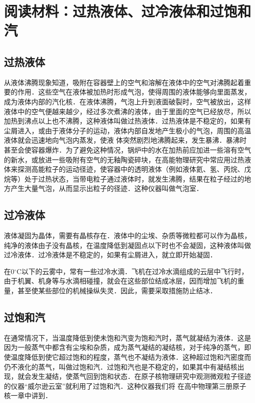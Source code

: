 \section*{阅读材料：过热液体、过冷液体和过饱和汽}
\subsection*{过热液体} 

从液体沸腾现象知道，吸附在容器壁上的空气和溶解在液体中的空气对沸腾起着重要的作用．这些空气在液体被加热时形成气泡，使得周围的液体能够向里面蒸发，成为液体内部的汽化核．在液体沸腾，气泡上升到液面破裂时，空气被放出，这样液体中的空气便越来越少，经过多次煮沸的液体，由于里面的空气已经放尽，所以加热到沸点以上也不沸腾，这种液体叫做过热液体．过热液体是不稳定的，如果有尘屑进入，或由于液体分子的运动，液体内部自发地产生极小的气泡，周围的高温液体就会迅速地向气泡内蒸发，使液
体突然剧烈地沸腾起来，发生暴沸．暴沸时甚至会使容器爆炸．为了避免这种情况，锅炉中的水在加热前应加进一些溶有空气的新水，或放进一些吸附有空气的无釉陶瓷碎块，在高能物理研究中常应用过热液体来探测高能粒子的运动径迹，使容器中的透明液体（例如液体氦、氢、丙烷、戊烷等）处于过热状态，当带电粒子通过液体时，就发生沸腾，结果在粒子经过的地方产生大量气泡，从而显示出粒子的径迹．这种仪器叫做气泡室．

\subsection*{过冷液体} 
液体凝固为晶体，需要有晶核存在．液体中的尘埃、杂质等微粒都可以作为晶核，纯净的液体由子没有晶核，在温度降低到凝固点以下时也不会凝固，这种液体叫做过冷液体．过冷液体是不稳定的，如果有尘屑进入，就立即开始凝固．

在0$^\circ$C以下的云雾中，常有一些过冷水滴．飞机在过冷水滴组成的云层中飞行时，由于机翼、机身等与水滴相碰撞，就会在这些部位结成冰层，因而增加飞机的重量，甚至使某些部位的机械操纵失灵．因此，需要采取措施防止结冰．

\subsection*{过饱和汽} 
在通常情况下，当温度降低到使未饱和汽变为饱和汽时，蒸气就凝结为液体．这是因为一般蒸气中都含有尘埃和杂质，成为蒸气凝结的凝结核，对于纯净的蒸气，即使温度降低到使它超过饱和的程度，蒸气也不凝结为液体．这种超过饱和汽密度而仍不液化的蒸气，叫做过饱和汽．过饱和汽也是不稳定的，如果其中有凝结核出现，就会发生凝结，使蒸气回到饱和状态．在原子核物理研究中观测微观粒子径迹的仪器“威尔逊云室”就利用了过饱和汽．这种仪器我们将
在高中物理第三册原子核一章中讲到．


